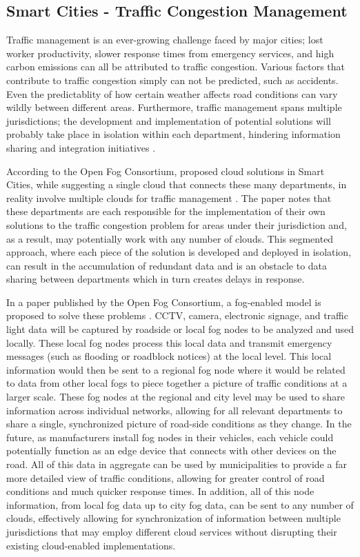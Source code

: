 \documentclass{article}
\begin{document}
\subsection{Smart Cities - Traffic Congestion Management}
Traffic management is an ever-growing challenge faced by major cities; lost worker productivity, slower response times from emergency services, and high carbon emissions can all be attributed to traffic congestion. Various factors that contribute to traffic congestion simply can not be predicted, such as accidents. Even the predictablity of how certain weather affects road conditions can vary wildly between different areas. Furthermore, traffic management spans multiple jurisdictions; the development and implementation of potential solutions will probably take place in isolation within each department, hindering information sharing and integration initiatives \cite{openfogconsortium2017trafficmanagement}.

According to the Open Fog Consortium, proposed cloud solutions in Smart Cities, while suggesting a single cloud that connects these many departments, in reality involve multiple clouds for traffic management \cite{openfogconsortium2017trafficmanagement}. The paper notes that these departments are each responsible for the implementation of their own solutions to the traffic congestion problem for areas under their jurisdiction and, as a result, may potentially work with any number of clouds. This segmented approach, where each piece of the solution is developed and deployed in isolation, can result in the accumulation of redundant data and is an obstacle to data sharing between departments which in turn creates delays in response.

In a paper published by the Open Fog Consortium, a fog-enabled model is proposed to solve these problems \cite{openfogconsortium2017trafficmanagement}. CCTV, camera, electronic signage, and traffic light data will be captured by roadside or local fog nodes to be analyzed and used locally. These local fog nodes process this local data and transmit emergency messages (such as flooding or roadblock notices) at the local level. This local information would then be sent to a regional fog node where it would be related to data from other local fogs to piece together a picture of traffic conditions at a larger scale. These fog nodes at the regional and city level may be used to share information across individual networks, allowing for all relevant departments to share a single, synchronized picture of road-side conditions as they change. In the future, as manufacturers install fog nodes in their vehicles, each vehicle could potentially function as an edge device that connects with other devices on the road. All of this data in aggregate can be used by municipalities to provide a far more detailed view of traffic conditions, allowing for greater control of road conditions and much quicker response times. In addition, all of this node information, from local fog data up to city fog data, can be sent to any number of clouds, effectively allowing for synchronization of information between multiple jurisdictions that may employ different cloud services without disrupting their existing cloud-enabled implementations.

\pagebreak

\renewcommand{\refname}{\section{References}}


\end{document}

